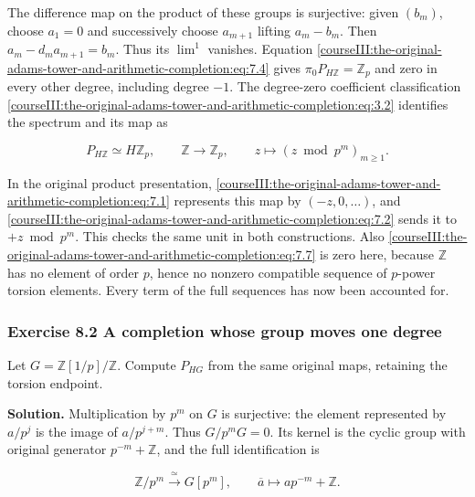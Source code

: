 The difference map on the product of these groups is surjective: given \((b_m)\), choose \(a_1=0\) and successively choose \(a_{m+1}\) lifting \(a_m-b_m\). Then \(a_m-d_ma_{m+1}=b_m\). Thus its \(\lim^1\) vanishes. Equation \eqref{courseIII:the-original-adams-tower-and-arithmetic-completion:eq:7.4} gives \(\pi_0P_{H\mathbb Z}=\mathbb Z_p\) and zero in every other degree, including degree \(-1\). The degree-zero coefficient classification \eqref{courseIII:the-original-adams-tower-and-arithmetic-completion:eq:3.2} identifies the spectrum and its map as

\begin{equation}
P_{H\mathbb Z}\simeq H\mathbb Z_p,
\qquad
\mathbb Z\longrightarrow\mathbb Z_p,
\qquad z\longmapsto(z\bmod p^m)_{m\geq1}.
\label{courseIII:the-original-adams-tower-and-arithmetic-completion:eq:8.2}
\end{equation}

In the original product presentation, \eqref{courseIII:the-original-adams-tower-and-arithmetic-completion:eq:7.1} represents this map by \((-z,0,\ldots)\), and \eqref{courseIII:the-original-adams-tower-and-arithmetic-completion:eq:7.2} sends it to \(+z\bmod p^m\). This checks the same unit in both constructions. Also \eqref{courseIII:the-original-adams-tower-and-arithmetic-completion:eq:7.7} is zero here, because \(\mathbb Z\) has no element of order \(p\), hence no nonzero compatible sequence of \(p\)-power torsion elements. Every term of the full sequences has now been accounted for.

\subsubsection{Exercise 8.2 A completion whose group moves one degree}
\label{courseIII:the-original-adams-tower-and-arithmetic-completion:exercise-8.2}

Let \(G=\mathbb Z[1/p]/\mathbb Z\). Compute \(P_{HG}\) from the same original maps, retaining the torsion endpoint.

\textbf{Solution.} Multiplication by \(p^m\) on \(G\) is surjective: the element represented by \(a/p^j\) is the image of \(a/p^{j+m}\). Thus \(G/p^mG=0\). Its kernel is the cyclic group with original generator \(p^{-m}+\mathbb Z\), and the full identification is

\begin{equation}
\mathbb Z/p^m\xrightarrow{\ \simeq\ }G[p^m],
\qquad \overline a\longmapsto ap^{-m}+\mathbb Z.
\label{courseIII:the-original-adams-tower-and-arithmetic-completion:eq:8.3}
\end{equation}

